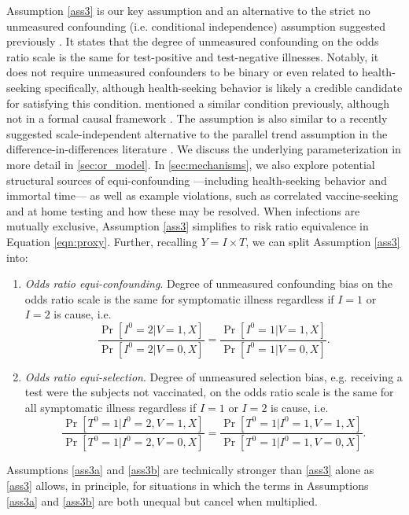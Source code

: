\documentclass[11pt]{article}
\begin{document}
Assumption \ref{ass3} is our key assumption and an alternative to the strict no unmeasured confounding (i.e. conditional independence) assumption suggested previously \cite{schnitzer_estimands_2022}. It states that the degree of unmeasured confounding on the odds ratio scale is the same for test-positive and test-negative illnesses. Notably, it does not require unmeasured confounders to be binary or even related to health-seeking specifically, although health-seeking behavior is likely a credible candidate for satisfying this condition. \citeauthor{lewnard_measurement_2018} mentioned a similar condition previously, although not in a formal causal framework \cite{lewnard_measurement_2018}. The assumption is also similar to a recently suggested scale-independent alternative to the parallel trend assumption in the difference-in-differences literature \cite{park_universal_2023,tchetgen_universal_2023}. We discuss the underlying parameterization in more detail in \ref{sec:or_model}. In  \ref{sec:mechanisms}, we also explore potential structural sources of equi-confounding ---including health-seeking behavior and immortal time--- as well as example violations, such as correlated vaccine-seeking  \cite{payne_impact_2023} and at home testing \cite{qasmieh2024magnitude} and how these may be resolved. When infections are mutually exclusive, Assumption \ref{ass3} simplifies to risk ratio equivalence in Equation \ref{eqn:proxy}.
Further, recalling $Y = I \times T$, we can split Assumption \ref{ass3}  into:
\begin{enumerate}[label=\upshape(A3\alph*), ref=A3\alph*]
    \item\label{ass3a}  \textit{Odds ratio equi-confounding}. Degree of unmeasured confounding bias on the odds ratio scale is the same for symptomatic illness regardless if $I=1$ or $I=2$ is cause, i.e. 
    $$\frac{\Pr[I^0 = 2 | V = 1, X]}{\Pr[I^0 = 2 | V = 0, X]} =\frac{\Pr[I^0 = 1 | V = 1, X]}{\Pr[I^0 = 1 | V = 0, X]}.$$
    \item\label{ass3b} \textit{Odds ratio equi-selection}. Degree of unmeasured selection bias, e.g. receiving a test were the subjects not vaccinated, on the odds ratio scale is the same for all symptomatic illness regardless if $I=1$ or $I=2$ is cause, i.e. 
    $$\frac{\Pr[T^0 = 1 | I^0 = 2, V = 1, X]}{\Pr[T^0 = 1 | I^0 = 2, V = 0, X]} =\frac{\Pr[T^0 = 1 | I^0 = 1, V = 1, X]}{\Pr[T^0 = 1 | I^0 = 1, V = 0, X]}.$$
\end{enumerate}
Assumptions \ref{ass3a} and \ref{ass3b} are technically stronger than \ref{ass3} alone as \ref{ass3} allows, in principle, for situations in which the terms in Assumptions \ref{ass3a} and \ref{ass3b} are both unequal but  cancel when multiplied. 
\end{document}
